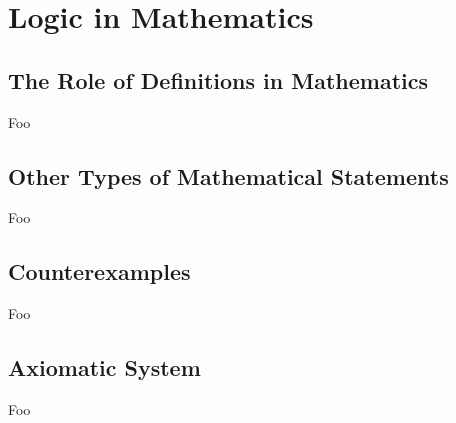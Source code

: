 \section{Logic in Mathematics}

\subsection{The Role of Definitions in Mathematics}

Foo

\subsection{Other Types of Mathematical Statements}

Foo

\subsection{Counterexamples}

Foo

\subsection{Axiomatic System}

Foo

